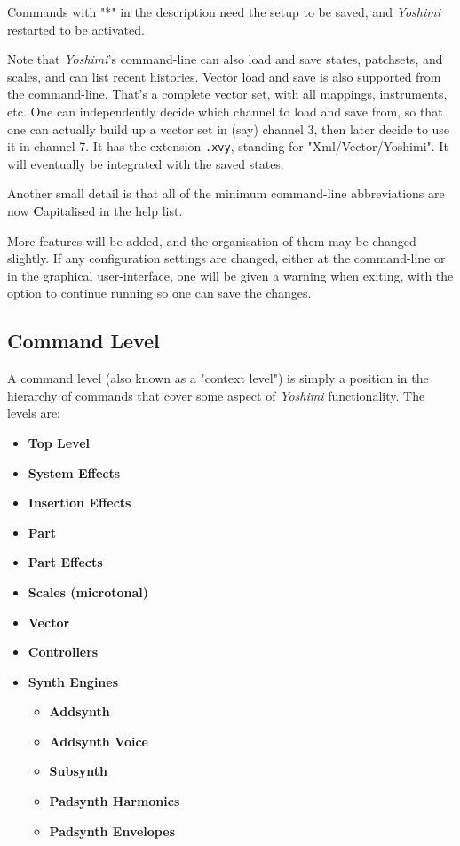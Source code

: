    Commands with "*" in the description need the setup to be saved,
   and \textsl{Yoshimi} restarted to be activated.

   Note that \textsl{Yoshimi}'s command-line can also load and save states,
   patchsets, and scales, and can list recent histories.
   Vector load and save is also supported from the command-line.
   That's a complete vector set, with all mappings, instruments, etc.
   One can independently decide which
   channel to load and save from, so that one
   can actually build up a vector set in
   (say) channel 3, then later decide to use it in channel 7.
   It has the extension \texttt{.xvy}, standing for "Xml/Vector/Yoshimi".
   It will eventually be integrated with the saved states.

   Another small detail is that all of the minimum command-line
   abbreviations are now \textbf{C}apitalised in the help list.

   More features will be added, and the organisation of them may be changed
   slightly.  If any configuration settings are changed, either at the
   command-line or in the graphical user-interface, one will be given a warning
   when exiting, with the option to continue running so one can save the
   changes.

\subsection{Command Level}
\label{subsec:command_line_command_level}

   A command level (also known as a "context level")
   is simply a position in the hierarchy of commands that cover
   some aspect of \textsl{Yoshimi} functionality.
   The levels are:

   \begin{itemize}
      \item \textbf{Top Level}
      \item \textbf{System Effects}
      \item \textbf{Insertion Effects}
      \item \textbf{Part}
      \item \textbf{Part Effects}
      \item \textbf{Scales (microtonal)}
      \item \textbf{Vector}
      \item \textbf{Controllers}
      \item \textbf{Synth Engines}
      \begin{itemize}
         \item \textbf{Addsynth}
         \item \textbf{Addsynth Voice}
         \item \textbf{Subsynth}
         \item \textbf{Padsynth Harmonics}
         \item \textbf{Padsynth Envelopes}
      \end{itemize}
   \end{itemize}

